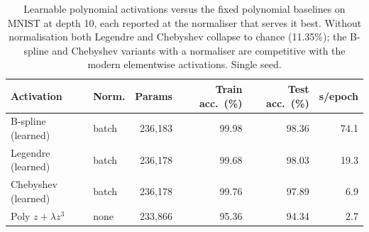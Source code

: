 \begin{table}[t]
\centering
\caption{Learnable polynomial activations versus the fixed polynomial baselines on MNIST at depth 10, each reported at the normaliser that serves it best. Without normalisation both Legendre and Chebyshev collapse to chance (11.35\%); the B-spline and Chebyshev variants with a normaliser are competitive with the modern elementwise activations. Single seed.}
\label{tab:learnpoly}
\small
\begin{tabular}{llrrrr}
\toprule
Activation & Norm. & Params & Train acc.\ (\%) & Test acc.\ (\%) & s/epoch \\
\midrule
B-spline (learned) & batch & 236,183 & 99.98 & 98.36 & 74.1 \\
Legendre (learned) & batch & 236,178 & 99.68 & 98.03 & 19.3 \\
Chebyshev (learned) & batch & 236,178 & 99.76 & 97.89 & 6.9 \\
Poly $z+\lambda z^3$ & none & 233,866 & 95.36 & 94.34 & 2.7 \\
\bottomrule
\end{tabular}
\end{table}